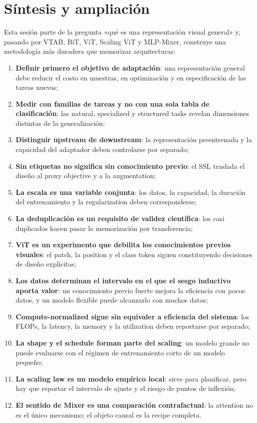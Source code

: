 \section{Síntesis y ampliación}

Esta sesión parte de la pregunta «qué es una representación visual general» y, pasando por VTAB, BiT, ViT, Scaling ViT y MLP-Mixer, construye una metodología más duradera que memorizar arquitecturas:

\begin{enumerate}
  \item \textbf{Definir primero el objetivo de adaptación}: una representación general debe reducir el costo en muestras, en optimización y en especificación de las tareas nuevas;
  \item \textbf{Medir con familias de tareas y no con una sola tabla de clasificación}: las natural, specialized y structured tasks revelan dimensiones distintas de la generalización;
  \item \textbf{Distinguir upstream de downstream}: la representación preentrenada y la capacidad del adaptador deben controlarse por separado;
  \item \textbf{Sin etiquetas no significa sin conocimiento previo}: el SSL traslada el diseño al proxy objective y a la augmentation;
  \item \textbf{La escala es una variable conjunta}: los datos, la capacidad, la duración del entrenamiento y la regularization deben corresponderse;
  \item \textbf{La deduplicación es un requisito de validez científica}: los casi duplicados hacen pasar la memorización por transferencia;
  \item \textbf{ViT es un experimento que debilita los conocimientos previos visuales}: el patch, la position y el class token siguen constituyendo decisiones de diseño explícitas;
  \item \textbf{Los datos determinan el intervalo en el que el sesgo inductivo aporta valor}: un conocimiento previo fuerte mejora la eficiencia con pocos datos, y un modelo flexible puede alcanzarlo con muchos datos;
  \item \textbf{Compute-normalized sigue sin equivaler a eficiencia del sistema}: los FLOPs, la latency, la memory y la utilization deben reportarse por separado;
  \item \textbf{La shape y el schedule forman parte del scaling}: un modelo grande no puede evaluarse con el régimen de entrenamiento corto de un modelo pequeño;
  \item \textbf{La scaling law es un modelo empírico local}: sirve para planificar, pero hay que reportar el intervalo de ajuste y el riesgo de puntos de inflexión;
  \item \textbf{El sentido de Mixer es una comparación contrafactual}: la attention no es el único mecanismo; el objeto causal es la recipe completa.
\end{enumerate}

